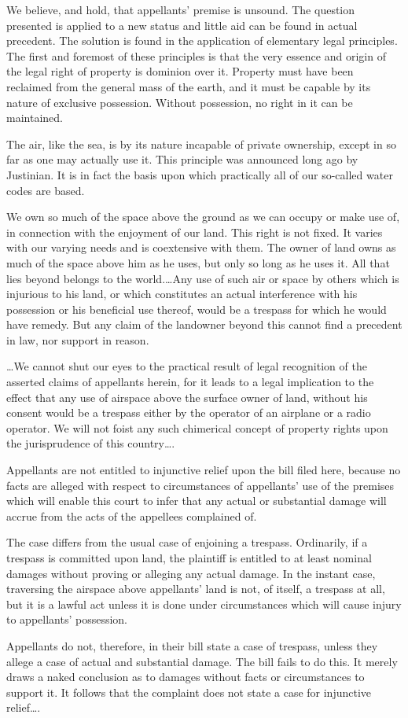 We believe, and hold, that appellants' premise is unsound. The question
presented is applied to a new status and little aid can be found in actual
precedent. The solution is found in the application of elementary legal
principles. The first and foremost of these principles is that the very essence
and origin of the legal right of property is dominion over it. Property must
have been reclaimed from the general mass of the earth, and it must be capable
by its nature of exclusive possession. Without possession, no right in it can
be maintained.

The air, like the sea, is by its nature incapable of private ownership, except
in so far as one may actually use it. This principle was announced long ago by
Justinian. It is in fact the basis upon which practically all of our so-called
water codes are based.

We own so much of the space above the ground as we can occupy or make use of, in
connection with the enjoyment of our land. This right is not fixed. It varies
with our varying needs and is coextensive with them. The owner of land owns as
much of the space above him as he uses, but only so long as he uses it. All
that lies beyond belongs to the world.\dots Any use of such air or space by
others which is injurious to his land, or which constitutes an actual
interference with his possession or his beneficial use thereof, would be a
trespass for which he would have remedy. But any claim of the landowner beyond
this cannot find a precedent in law, nor support in reason.

\dots We cannot shut our eyes to the practical result of legal recognition of
the asserted claims of appellants herein, for it leads to a legal implication
to the effect that any use of airspace above the surface owner of land, without
his consent would be a trespass either by the operator of an airplane or a
radio operator. We will not foist any such chimerical concept of property
rights upon the jurisprudence of this country\dots.

Appellants are not entitled to injunctive relief upon the bill filed here,
because no facts are alleged with respect to circumstances of appellants' use
of the premises which will enable this court to infer that any actual or
substantial damage will accrue from the acts of the appellees complained of.

The case differs from the usual case of enjoining a trespass. Ordinarily, if a
trespass is committed upon land, the plaintiff is entitled to at least nominal
damages without proving or alleging any actual damage. In the instant case,
traversing the airspace above appellants' land is not, of itself, a trespass at
all, but it is a lawful act unless it is done under circumstances which will
cause injury to appellants' possession.

Appellants do not, therefore, in their bill state a case of trespass, unless
they allege a case of actual and substantial damage. The bill fails to do this.
It merely draws a naked conclusion as to damages without facts or circumstances
to support it. It follows that the complaint does not state a case for
injunctive relief\dots.

